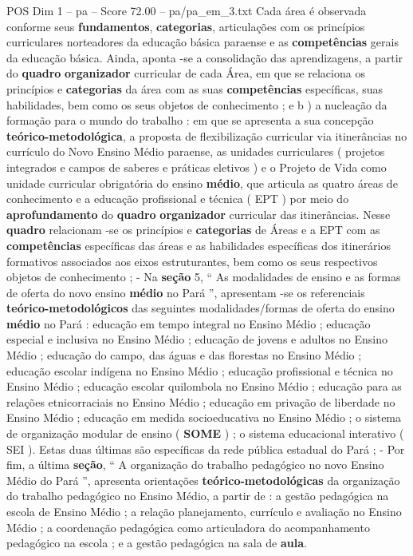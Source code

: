 \begin{textsample}{POS Dim 1 – pa – Score 72.00 – pa/pa\_em\_3.txt}
Cada área é observada conforme seus \textbf{fundamentos}, \textbf{categorias}, articulações com os princípios curriculares norteadores da educação básica paraense e as \textbf{competências} gerais da educação básica.
Ainda, aponta -se a consolidação das aprendizagens, a partir do \textbf{quadro} \textbf{organizador} curricular de cada Área, em que se relaciona os princípios e \textbf{categorias} da área com as suas \textbf{competências} específicas, suas habilidades, bem como os seus objetos de conhecimento ; e b ) a nucleação da formação para o mundo do trabalho : em que se apresenta a sua concepção \textbf{teórico-metodológica}, a proposta de flexibilização curricular via itinerâncias no currículo do Novo Ensino Médio paraense, as unidades curriculares ( projetos integrados e campos de saberes e práticas eletivos ) e o Projeto de Vida como unidade curricular obrigatória do ensino \textbf{médio}, que articula as quatro áreas de conhecimento e a educação profissional e técnica ( EPT ) por meio do \textbf{aprofundamento} do \textbf{quadro} \textbf{organizador} curricular das itinerâncias.
Nesse \textbf{quadro} relacionam -se os princípios e \textbf{categorias} de Áreas e a EPT com as \textbf{competências} específicas das áreas e as habilidades específicas dos itinerários formativos associados aos eixos estruturantes, bem como os seus respectivos objetos de conhecimento ; - Na \textbf{seção} 5, “ As modalidades de ensino e as formas de oferta do novo ensino \textbf{médio} no Pará ”, apresentam -se os referenciais \textbf{teórico-metodológicos} das seguintes modalidades/formas de oferta do ensino \textbf{médio} no Pará : educação em tempo integral no Ensino Médio ; educação especial e inclusiva no Ensino Médio ; educação de jovens e adultos no Ensino Médio ; educação do campo, das águas e das florestas no Ensino Médio ; educação escolar indígena no Ensino Médio ; educação profissional e técnica no Ensino Médio ; educação escolar quilombola no Ensino Médio ; educação para as relações etnicorraciais no Ensino Médio ; educação em privação de liberdade no Ensino Médio ; educação em medida socioeducativa no Ensino Médio ; o sistema de organização modular de ensino ( \textbf{SOME} ) ; o sistema educacional interativo ( SEI ).
Estas duas últimas são específicas da rede pública estadual do Pará ; - Por fim, a última \textbf{seção}, “ A organização do trabalho pedagógico no novo Ensino Médio do Pará ”, apresenta orientações \textbf{teórico-metodológicas} da organização do trabalho pedagógico no Ensino Médio, a partir de : a gestão pedagógica na escola de Ensino Médio ; a relação planejamento, currículo e avaliação no Ensino Médio ; a coordenação pedagógica como articuladora do acompanhamento pedagógico na escola ; e a gestão pedagógica na sala de \textbf{aula}.

\end{textsample}
